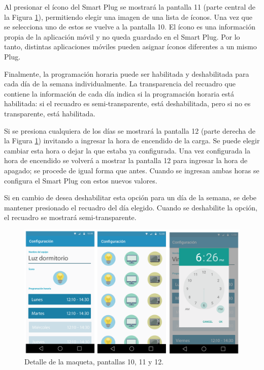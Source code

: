 \begin{itemize}
Al presionar el ícono del Smart Plug se mostrará la pantalla 11 (parte central de la Figura \ref{fig:app_wireframe_4}), permitiendo elegir una imagen de una lista de íconos. Una vez que se selecciona uno de estos se vuelve a la pantalla 10. El ícono es una información propia de la aplicación móvil y no queda guardado en el Smart Plug. Por lo tanto, distintas aplicaciones móviles pueden asignar íconos diferentes a un mismo Plug.

Finalmente, la programación horaria puede ser habilitada y deshabilitada para cada día de la semana individualmente. La transparencia del recuadro que contiene la información de cada día indica si la programación horaria está habilitada: si el recuadro es semi-transparente, está deshabilitada, pero si no es transparente, está habilitada. 

Si se presiona cualquiera de los días se mostrará la pantalla 12 (parte derecha de la Figura \ref{fig:app_wireframe_4}) invitando a ingresar la hora de encendido de la carga. Se puede elegir cambiar esta hora o dejar la que estaba ya configurada. Una vez configurada la hora de encendido se volverá a mostrar la pantalla 12 para ingresar la hora de apagado; se procede de igual forma que antes. Cuando se ingresan ambas horas se configura el Smart Plug con estos nuevos valores.

Si en cambio de desea deshabilitar esta opción para un día de la semana, se debe mantener presionado el recuadro del día elegido. Cuando se deshabilite la opción, el recuadro se mostrará semi-transparente.

\end{itemize}


\begin{figure}[!h]
	\centering
	\includegraphics[width=14cm]{./Figures/3_3_1_app_wireframe_4.png}
	\caption{Detalle de la maqueta, pantallas 10, 11 y 12.}
	\label{fig:app_wireframe_4}
\end{figure}




